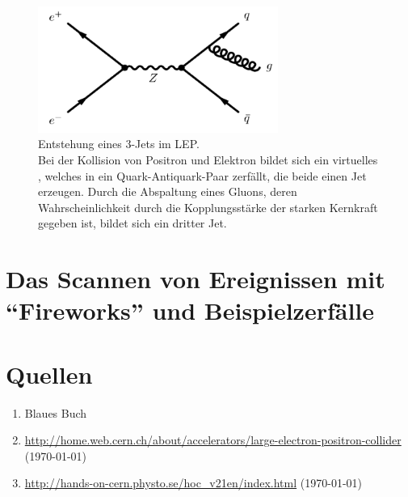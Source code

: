 \documentclass[a4paper,ngerman]{scrartcl}
\begin{document}
\begin{figure}[tbh!]
  \centering
  \includegraphics[width=0.7\textwidth]{abbildungen/3jet_feyn.png}
  \caption{Entstehung eines 3-Jets im LEP.\\ Bei der Kollision von Positron und Elektron bildet sich ein virtuelles \PZzero, welches in ein Quark-Antiquark-Paar zerfällt, die beide einen Jet erzeugen. Durch die Abspaltung eines Gluons, deren Wahrscheinlichkeit durch die Kopplungsstärke der starken Kernkraft gegeben ist, bildet sich ein dritter Jet.}
  \label{fig:3jet}
\end{figure}










\section{Das Scannen von Ereignissen mit "`Fireworks"' und Beispielzerfälle}
\label{sec:scannen}

\section{Quellen}
\begin{enumerate}
\item Blaues Buch \label{ref:BB}
\item \url{http://home.web.cern.ch/about/accelerators/large-electron-positron-collider} (\today) \label{ref:cernlep}
\item \url{http://hands-on-cern.physto.se/hoc_v21en/index.html} (\today)\label{ref:hands-on}
\end{enumerate}
\end{document}
